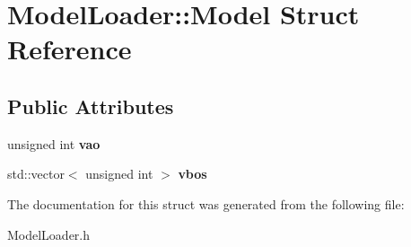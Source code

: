 \hypertarget{structModelLoader_1_1Model}{
\section{ModelLoader::Model Struct Reference}
\label{structModelLoader_1_1Model}
}
\subsection*{Public Attributes}
\begin{DoxyCompactItemize}
\item 
\hypertarget{structModelLoader_1_1Model_ac3c84846445eae0f611ea5bb4636af9a}{
unsigned int {\bfseries vao}}
\label{structModelLoader_1_1Model_ac3c84846445eae0f611ea5bb4636af9a}

\item 
\hypertarget{structModelLoader_1_1Model_a85503625bc4005bfab6842b42ce8690d}{
std::vector$<$ unsigned int $>$ {\bfseries vbos}}
\label{structModelLoader_1_1Model_a85503625bc4005bfab6842b42ce8690d}

\end{DoxyCompactItemize}


The documentation for this struct was generated from the following file:\begin{DoxyCompactItemize}
\item 
ModelLoader.h\end{DoxyCompactItemize}

